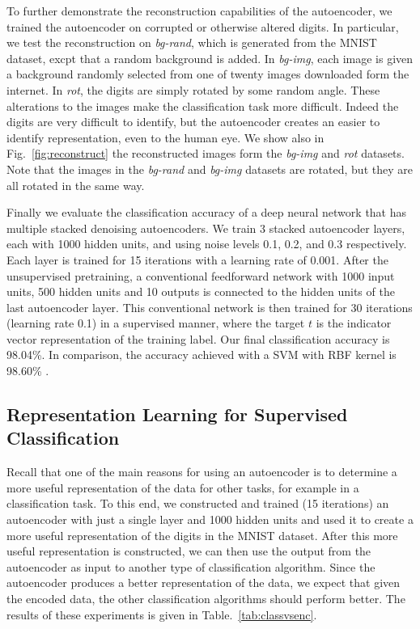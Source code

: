 To further demonstrate the reconstruction capabilities of the autoencoder, we
trained the autoencoder on corrupted or otherwise altered digits.  In
particular, we test the reconstruction on \textit{bg-rand}, which is generated
from the MNIST dataset, excpt that a random background is added. In
\textit{bg-img}, each image is given a background randomly selected from one of
twenty images downloaded form the internet. In \textit{rot}, the digits are
simply rotated by some random angle.  These alterations to the images make the
classification task more difficult. Indeed the digits are very difficult to
identify, but the autoencoder creates an easier to identify representation,
even to the human eye. We show also in Fig.~\ref{fig:reconstruct} the
reconstructed images form the \textit{bg-img} and \textit{rot} datasets. Note
that the images in the \textit{bg-rand} and \textit{bg-img} datasets are
rotated, but they are all rotated in the same way.



Finally we evaluate the classification accuracy of a deep neural network that
has multiple stacked denoising autoencoders. We train 3 stacked autoencoder
layers, each with 1000 hidden units, and using noise levels 0.1, 0.2, and 0.3
respectively. Each layer is trained for 15 iterations with a learning rate of
0.001. After the unsupervised pretraining, a conventional feedforward network
with 1000 input units, 500 hidden units and 10 outputs is connected to the
hidden units of the last autoencoder layer. This conventional network is then
trained for 30 iterations (learning rate 0.1) in a supervised manner, where the
target $t$ is the indicator vector representation of the training label. Our
final classification accuracy is 98.04\%. In comparison, the accuracy achieved
with a SVM with RBF kernel is 98.60\% \cite{vincent2010stacked}.

\subsection{Representation Learning for Supervised Classification}

Recall that one of the main reasons for using an autoencoder is to determine a
more useful representation of the data for other tasks, for example in a
classification task. To this end, we constructed and trained (15 iterations) an
autoencoder with just a single layer and 1000 hidden units and used it to
create a more useful representation of the digits in the MNIST dataset. After
this more useful representation is constructed, we can then use the output from
the autoencoder as input to another type of classification algorithm.  Since
the autoencoder produces a better representation of the data, we expect that
given the encoded data, the other classification algorithms should perform
better.  The results of these experiments is given in
Table.~\ref{tab:classvsenc}.

